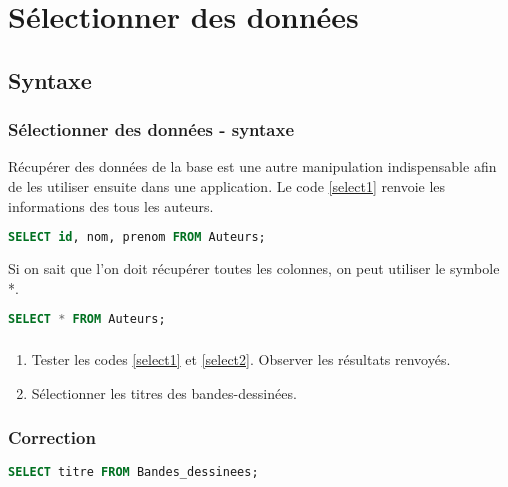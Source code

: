 \documentclass[svgnames,11pt]{beamer}
\begin{document}
\section{Sélectionner des données}
\subsection{Syntaxe}
\begin{frame}[fragile]
    \frametitle{Sélectionner des données - syntaxe}

    Récupérer des données de la base est une autre manipulation indispensable afin de les utiliser ensuite dans une application. Le code \ref{select1} renvoie les informations des tous les auteurs.
    \begin{center}
        \begin{lstlisting}[language=SQL , basicstyle=\ttfamily\small, xleftmargin=1em, xrightmargin=-1em]
SELECT id, nom, prenom FROM Auteurs;
\end{lstlisting}
        \label{select1}
    \end{center}

\end{frame}
\begin{frame}[fragile]

    Si on sait que l'on doit récupérer toutes les colonnes, on peut utiliser le symbole *.
    \begin{center}
        \begin{lstlisting}[language=SQL , basicstyle=\ttfamily\small, xleftmargin=1em, xrightmargin=-1em]
SELECT * FROM Auteurs;
\end{lstlisting}
        \label{select2}
    \end{center}

\end{frame}
\begin{frame}
    \frametitle{}

    \begin{activite}
        \begin{enumerate}
            \item Tester les codes \ref{select1} et \ref{select2}. Observer les résultats renvoyés.
            \item Sélectionner les titres des bandes-dessinées.
        \end{enumerate}
    \end{activite}

\end{frame}
\begin{frame}[fragile]
    \frametitle{Correction}

    \begin{center}
        \begin{lstlisting}[language=SQL , basicstyle=\ttfamily\small, xleftmargin=1em, xrightmargin=-1em]
SELECT titre FROM Bandes_dessinees;
\end{lstlisting}
        \label{select1}
    \end{center}

\end{frame}
\end{document}
